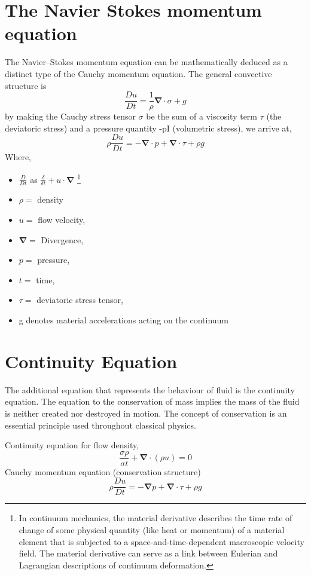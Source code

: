 \documentclass{article}
\begin{document}
\section{The Navier Stokes momentum equation}
The Navier–Stokes momentum equation can be mathematically deduced as a distinct type of the Cauchy momentum equation. The general convective structure is
$$\frac{Du}{Dt}=\frac{1}{\rho}\mathbf{\nabla}\cdot\sigma + g $$
by making the Cauchy stress tensor $\sigma$ be the sum of a viscosity term $\tau$ (the deviatoric stress) and a pressure quantity -pI (volumetric stress), we arrive at,
$$\rho\frac{Du}{Dt}=-\mathbf{\nabla}\cdot p + \mathbf{\nabla}\cdot\tau  + \rho g$$
Where,
\begin{itemize}
    \item $\frac{D}{Dt}$ as $\frac{\delta}{\delta t} + u\cdot\mathbf{\nabla}$ \footnote{In continuum mechanics, the material derivative describes the time rate of change of some physical quantity (like heat or momentum) of a material element that is subjected to a space-and-time-dependent macroscopic velocity field. The material derivative can serve as a link between Eulerian and Lagrangian descriptions of continuum deformation.}
    \item $\rho =$  density
    \item $u =$ flow velocity,
    \item $\mathbf{\nabla} =$ Divergence,
    \item $p =$ pressure,
    \item $t =$ time,
    \item $\tau =$ deviatoric stress tensor,
    \item g denotes material accelerations acting on the continuum 
\end{itemize}
\section{Continuity Equation}
The additional equation that represents the behaviour of fluid is the continuity equation. The equation to the conservation of mass implies the mass of the fluid is neither created nor destroyed in motion. The concept of conservation is an essential principle used throughout classical physics.

Continuity equation for flow density,
$$\frac{\sigma \rho}{\sigma t} + \mathbf{\nabla}\cdot(\rho u) =0$$
Cauchy momentum equation (conservation structure)
$$ \rho\frac{Du}{Dt}=-\mathbf{\nabla}p +\mathbf{\nabla}\cdot\tau+\rho g$$
\end{document}
